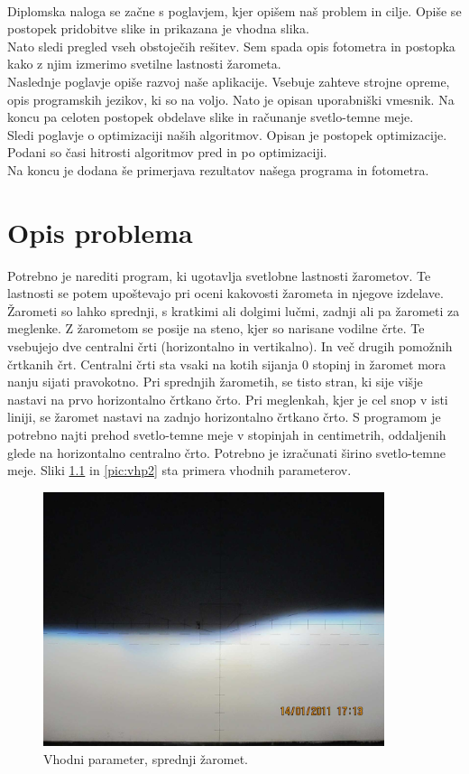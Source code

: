 \documentclass[oneside, a4paper, 12pt]{book}
\begin{document}
\\
Diplomska naloga se začne s poglavjem, kjer opišem naš problem in cilje. Opiše se postopek pridobitve slike in prikazana je vhodna slika.\\
Nato sledi pregled vseh obstoječih rešitev. Sem spada opis fotometra in postopka kako z njim izmerimo svetilne lastnosti žarometa.\\
Naslednje poglavje opiše razvoj naše aplikacije. Vsebuje zahteve strojne opreme, opis programskih jezikov, ki so na voljo. Nato je opisan uporabniški vmesnik. Na koncu pa celoten postopek obdelave slike in računanje svetlo-temne meje.\\
Sledi poglavje o optimizaciji naših algoritmov. Opisan je postopek optimizacije. Podani so časi hitrosti algoritmov pred in po optimizaciji.\\
Na koncu je dodana še primerjava rezultatov našega programa in fotometra.

\chapter{Opis problema}
Potrebno je narediti program, ki ugotavlja svetlobne lastnosti žarometov. Te lastnosti se potem upoštevajo pri oceni kakovosti žarometa in njegove izdelave. Žarometi so lahko sprednji, s kratkimi ali dolgimi lučmi, zadnji ali pa žarometi za meglenke.
Z žarometom se posije na steno, kjer so narisane vodilne črte. Te vsebujejo dve centralni črti (horizontalno in vertikalno). In več drugih pomožnih črtkanih črt. Centralni črti sta vsaki na kotih sijanja 0 stopinj in žaromet mora nanju sijati pravokotno. Pri sprednjih žarometih, se tisto stran, ki sije višje nastavi na prvo horizontalno črtkano črto. Pri meglenkah, kjer je cel snop v isti liniji, se žaromet nastavi na zadnjo horizontalno črtkano črto. 
S programom je potrebno najti prehod svetlo-temne meje v stopinjah in centimetrih, oddaljenih glede na horizontalno centralno črto. Potrebno je izračunati širino svetlo-temne meje.
Sliki \ref{pic:vhp1} in \ref{pic:vhp2} sta primera vhodnih parameterov.

\begin{figure}
\begin{center}
\includegraphics[width=10cm]{slike/original.jpg}
\end{center}
\caption{Vhodni parameter, sprednji žaromet.}
\label{pic:vhp1}
\end{figure}
\end{document}

